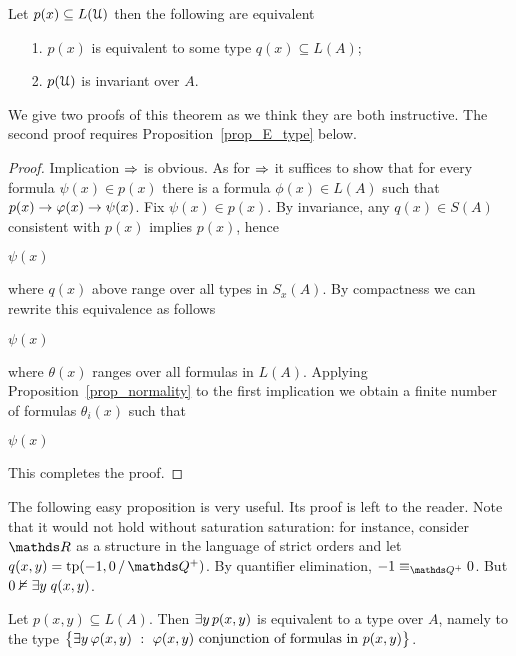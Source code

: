 \documentclass[creche.tex]{subfiles}
\begin{document}
\begin{proposition}\label{prop_inv_types}
Let $p(x)\subseteq L(\EuScript U)$ then the following are equivalent
\begin{itemize}
 \item[1.] $p(x)$ is equivalent to some type $q(x)\subseteq L(A)$;
 \item[2.] $p(\EuScript U)$ is invariant over $A$.
\end{itemize}
\end{proposition}

We give two proofs of this theorem as we think they are both instructive.  The second proof requires Proposition~\ref{prop_E_type} below.

\begin{proof}
Implication $\Rightarrow$ is obvious. As for $\Rightarrow$ it suffices to show that for every formula $\psi(x)\in p(x)$ there is a formula $\phi(x)\in L(A)$ such that $p(x)\rightarrow\varphi(x)\rightarrow\psi(x)$. Fix $\psi(x)\in p(x)$. By invariance, any $q(x)\in S(A)$ consistent with $p(x)$ implies $p(x)$, hence

\medrel{\imp}$\psi(x)$

where $q(x)$ above range over all types in $S_x(A)$. By compactness we can rewrite this equivalence as follows

\medrel{\imp}$\psi(x)$

where $\theta(x)$ ranges over all formulas in $L(A)$. Applying Proposition~\ref{prop_normality} to the first implication we obtain a finite number of formulas $\theta_i(x)$ such that 

\medrel{\imp}$\psi(x)$

This completes the proof.
\end{proof}

The following easy proposition is very useful. Its proof is left to the reader. Note that it would not hold without saturation saturation: for instance, consider $\RR$ as a structure in the language of strict orders and let $q(x,y)=\tp(-1, 0\,/\,\QQ^+)$. By quantifier elimination, $-1\equiv_{\QQ^+}0$. But $0\nvDash\exists y\;q(x,y)$.


\begin{proposition}\label{prop_E_type}
Let $p(x,y)\subseteq L(A)$. Then $\exists y\,p(x,y)$ is equivalent to a type over $A$, namely to the type $\big\{ \E y\,\phi(x,y)\ :\ \phi(x,y) \textrm{ conjunction of formulas in }  p(x,y)\big\}$.\QED 
\end{proposition}
\end{document}
